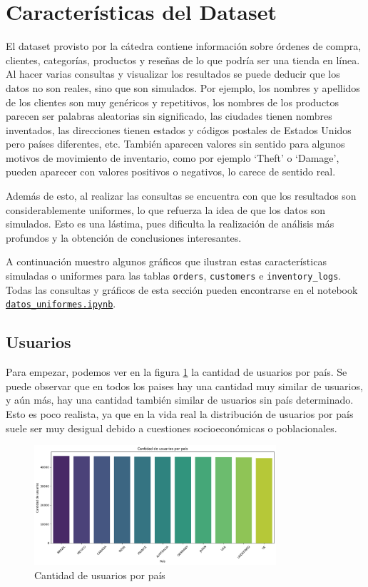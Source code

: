 \section{Características del Dataset}

El dataset provisto por la cátedra contiene información sobre órdenes de compra, clientes, categorías, productos y reseñas de lo que podría ser una tienda en línea. \\
Al hacer varias consultas y visualizar los resultados se puede deducir que los datos no son reales, sino que son simulados. 
Por ejemplo, los nombres y apellidos de los clientes son muy genéricos y repetitivos, los nombres de los productos parecen ser palabras aleatorias sin significado, las ciudades tienen nombres inventados, las direcciones tienen estados y códigos postales de Estados Unidos pero países diferentes, etc. También aparecen valores sin sentido para algunos motivos de movimiento de inventario, como por ejemplo `Theft' o `Damage', pueden aparecer con valores positivos o negativos, lo carece de sentido real.

Además de esto, al realizar las consultas se encuentra con que los resultados son considerablemente uniformes, lo que refuerza la idea de que los datos son simulados. Esto es una lástima, pues dificulta la realización de análisis más profundos y la obtención de conclusiones interesantes.

A continuación muestro algunos gráficos que ilustran estas características simuladas o uniformes para las tablas \texttt{orders}, \texttt{customers} e \texttt{inventory\_logs}. Todas las consultas y gráficos de esta sección pueden encontrarse en el notebook \href{https://github.com/patricioibar/datos-tp1/blob/main/datos_uniformes.ipynb}{\texttt{datos\_uniformes.ipynb}}.

\subsection{Usuarios}
Para empezar, podemos ver en la figura \ref{fig:usuarios_por_pais} la cantidad de usuarios por país. Se puede observar que en todos los paises hay una cantidad muy similar de usuarios, y aún más, hay una cantidad también similar de usuarios sin país determinado. Esto es poco realista, ya que en la vida real la distribución de usuarios por país suele ser muy desigual debido a cuestiones socioeconómicas o poblacionales.
\begin{figure}[H]
    \centering
    \includegraphics[width=0.8\textwidth]{imagenes/datos_uniformes/usuarios_por_pais.png}
    \caption{Cantidad de usuarios por país}
    \label{fig:usuarios_por_pais}
\end{figure}

